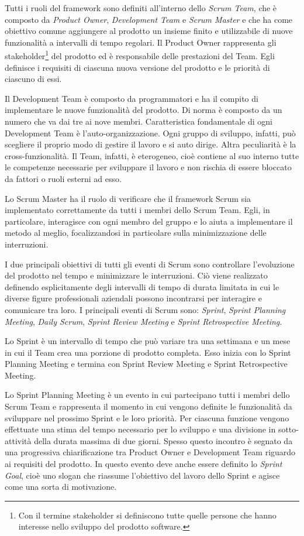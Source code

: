 			Tutti i ruoli del framework sono definiti all'interno dello \emph{Scrum Team}, che è composto da \emph{Product Owner}, \emph{Development Team} e \emph{Scrum Master} e che ha come obiettivo comune aggiungere al prodotto un insieme finito e utilizzabile di nuove funzionalità a intervalli di tempo regolari.
			Il Product Owner rappresenta gli stakeholder\footnote{Con il termine stakeholder si definiscono tutte quelle persone che hanno interesse nello sviluppo del prodotto software.} del prodotto ed è responsabile delle prestazioni del Team.
			Egli definisce i requisiti di ciascuna nuova versione del prodotto e le priorità di ciascuno di essi.
			
			Il Development Team è composto da programmatori e ha il compito di implementare le nuove funzionalità del prodotto.
			Di norma è composto da un numero che va dai tre ai nove membri.
			Caratteristica fondamentale di ogni Development Team è l'auto-organizzazione. 
			Ogni gruppo di sviluppo, infatti, può scegliere il proprio modo di gestire il lavoro e si auto dirige.
			Altra peculiarità è la cross-funzionalità.
			Il Team, infatti, è eterogeneo, cioè contiene al suo interno tutte le competenze necessarie per sviluppare il lavoro e non rischia di essere bloccato da fattori o ruoli esterni ad esso. 
			
			Lo Scrum Master ha il ruolo di verificare che il framework Scrum sia implementato correttamente da tutti i membri dello Scrum Team.
			Egli, in particolare, interagisce con ogni membro del gruppo e lo aiuta a implementare il metodo al meglio, focalizzandosi in particolare sulla minimizzazione delle interruzioni.

			I due principali obiettivi di tutti gli eventi di Scrum sono controllare l'evoluzione del prodotto nel tempo e minimizzare le interruzioni. 
			Ciò viene realizzato definendo esplicitamente degli intervalli di tempo di durata limitata in cui le diverse figure professionali aziendali possono incontrarsi per interagire e comunicare tra loro.
			I principali eventi di Scrum sono: \emph{Sprint}, \emph{Sprint Planning Meeting}, \emph{Daily Scrum}, \emph{Sprint Review Meeting} e \emph{Sprint Retrospective Meeting}.

			Lo Sprint è un intervallo di tempo che può variare tra una settimana e un mese in cui il Team crea una porzione di prodotto completa. 
			Esso inizia con lo Sprint Planning Meeting e termina con Sprint Review Meeting e Sprint Retrospective Meeting.
			
			Lo Sprint Planning Meeting è un evento in cui partecipano tutti i membri dello Scrum Team e rappresenta il momento in cui vengono definite le funzionalità da sviluppare nel prossimo Sprint e le loro priorità.
			Per ciascuna funzione vengono effettuate una stima del tempo necessario per lo sviluppo e una divisione in sotto-attività della durata massima di due giorni.
			Spesso questo incontro è segnato da una progressiva chiarificazione tra Product Owner e Development Team riguardo ai requisiti del prodotto. 
			In questo evento deve anche essere definito lo \emph{Sprint Goal}, cioè uno slogan che riassume l'obiettivo del lavoro dello Sprint e agisce come una sorta di motivazione.
		
